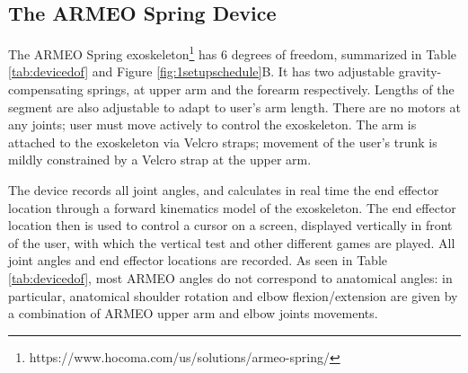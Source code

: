 \subsection{The ARMEO Spring Device}

The ARMEO Spring exoskeleton\footnote{https://www.hocoma.com/us/solutions/armeo-spring/} has 6 degrees of freedom, summarized in Table \ref{tab:devicedof} and Figure \ref{fig:1setupschedule}B. 
It has two adjustable gravity-compensating springs, at upper arm and the forearm respectively. 
Lengths of the segment are also adjustable to adapt to user’s arm length. 
There are no motors at any joints; user must move actively to control the exoskeleton. 
The arm is attached to the exoskeleton via Velcro straps; movement of the user’s trunk is mildly constrained by a Velcro strap at the upper arm.

The device records all joint angles, and calculates in real time the end effector location through a forward kinematics model of the exoskeleton. 
The end effector location then is used to control a cursor on a screen, displayed vertically in front of the user, with which the vertical test and other different games are played. 
All joint angles and end effector locations are recorded. As seen in Table \ref{tab:devicedof}, most ARMEO angles do not correspond to anatomical angles: in particular, anatomical shoulder rotation and elbow flexion/extension are given by a combination of ARMEO upper arm and elbow joints movements. 


